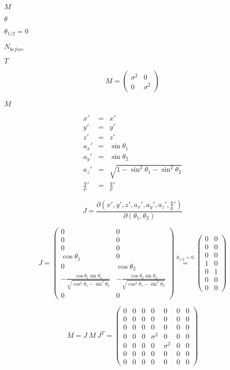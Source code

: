 \documentclass{article}
\begin{document}
$M$
\pagebreak

$\theta$
\pagebreak

$\theta_{1/2}=0$
\pagebreak

$N_{before}$
\pagebreak

$T$
\pagebreak

\[ M=\left(\begin{array}{cc} \sigma^{2} & 0\\ 0 & \sigma^{2}\end{array}\right)\]
\pagebreak

$\overline{M}$
\pagebreak

\begin{eqnarray*} x' & = & x'\\ y' & = & y'\\ z' & = & z'\\ a_{x}' & = & \sin\theta_{1}\\ a_{y}' & = & \sin\theta_{2}\\ a_{z}' & = & \sqrt{1-\sin^{2}\theta_{1}-\sin^{2}\theta_{2}}\\ \frac{q}{p}' & = & \frac{q}{p}'\end{eqnarray*}
\pagebreak

\[ J=\frac{\partial\left(x',y',z',a_{x}',a_{y}',a_{z}',\frac{q}{p}'\right)}{\partial\left(\theta_{1},\theta_{2}\right)}\]
\pagebreak

\[ J=\left(\begin{array}{cc} 0 & 0\\ 0 & 0\\ 0 & 0\\ \cos\theta_{1} & 0\\ 0 & \cos\theta_{2}\\ -\frac{\cos\theta_{1}\sin\theta_{1}}{\sqrt{\cos^{2}\theta_{1}-\sin^{2}\theta_{2}}} & -\frac{\cos\theta_{2}\sin\theta_{2}}{\sqrt{\cos^{2}\theta_{1}-\sin^{2}\theta_{2}}}\\ 0 & 0\end{array}\right) \overset{\theta_{1/2}=0}{=} \left(\begin{array}{cc} 0 & 0\\ 0 & 0\\ 0 & 0\\ 1 & 0\\ 0 & 1\\ 0 & 0\\ 0 & 0\end{array}\right)\]
\pagebreak

\[ \overline{M}=J\: M\: J^{T}=\left(\begin{array}{ccccccc} 0 & 0 & 0 & 0 & 0 & 0 & 0\\ 0 & 0 & 0 & 0 & 0 & 0 & 0\\ 0 & 0 & 0 & 0 & 0 & 0 & 0\\ 0 & 0 & 0 & \sigma^{2} & 0 & 0 & 0\\ 0 & 0 & 0 & 0 & \sigma^{2} & 0 & 0\\ 0 & 0 & 0 & 0 & 0 & 0 & 0\\ 0 & 0 & 0 & 0 & 0 & 0 & 0\end{array}\right)\]
\pagebreak
\end{document}
